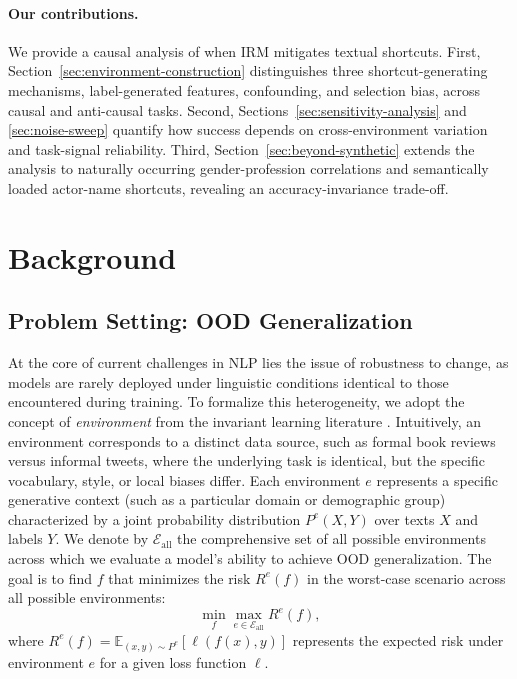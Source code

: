 \documentclass[11pt]{article}
\theoremstyle{definition}
\theoremstyle{plain}
\begin{document}
\paragraph{Our contributions.} We provide a causal analysis of when IRM mitigates textual shortcuts. First, Section~\ref{sec:environment-construction} distinguishes three shortcut-generating mechanisms, label-generated features, confounding, and selection bias, across causal and anti-causal tasks. Second, Sections~\ref{sec:sensitivity-analysis} and \ref{sec:noise-sweep} quantify how success depends on cross-environment variation and task-signal reliability. Third, Section~\ref{sec:beyond-synthetic} extends the analysis to naturally occurring gender-profession correlations and semantically loaded actor-name shortcuts, revealing an accuracy-invariance trade-off.


\section{Background}

\subsection{Problem Setting: OOD Generalization}

At the core of current challenges in NLP lies the issue of robustness to change, as models are rarely deployed under linguistic conditions identical to those encountered during training. To formalize this heterogeneity, we adopt the concept of \emph{environment} from the invariant learning literature \citep{peters2016causal, arjovsky2019invariant}. Intuitively, an environment corresponds to a distinct data source, such as formal book reviews versus informal tweets, where the underlying task is identical, but the specific vocabulary, style, or local biases differ. Each environment $e$ represents a specific generative context (such as a particular domain or demographic group) characterized by a joint probability distribution $P^e(X,Y)$ over texts $X$ and labels $Y$. We denote by $\mathcal{E}_{\text{all}}$ the comprehensive set of all possible environments across which we evaluate a model's ability to achieve OOD generalization. The goal is to find $f$ that minimizes the risk $R^e(f)$ in the worst-case scenario across all possible environments:
\[
\min_f \max_{e \in \mathcal{E}_{\text{all}}} R^e(f),
\]
where $R^e(f) = \mathbb{E}_{(x,y)\sim P^e}[\ell(f(x),y)]$ represents the expected risk under environment $e$ for a given loss function $\ell$.
\end{document}
